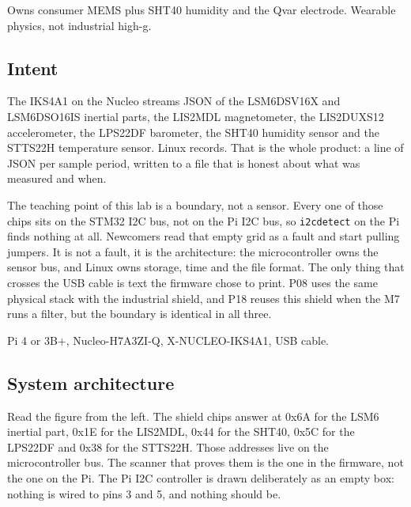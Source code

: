 
\begin{unique}
Owns consumer MEMS plus SHT40 humidity and the Qvar electrode. Wearable physics, not
industrial high-g.
\end{unique}

\subsection*{Intent}

The IKS4A1 on the Nucleo streams JSON of the LSM6DSV16X and LSM6DSO16IS inertial parts,
the LIS2MDL magnetometer, the LIS2DUXS12 accelerometer, the LPS22DF barometer, the SHT40
humidity sensor and the STTS22H temperature sensor. Linux records. That is the whole
product: a line of JSON per sample period, written to a file that is honest about what was
measured and when.

The teaching point of this lab is a boundary, not a sensor. Every one of those chips sits
on the STM32 I2C bus, not on the Pi I2C bus, so \texttt{i2cdetect} on the Pi finds nothing
at all. Newcomers read that empty grid as a fault and start pulling jumpers. It is not a
fault, it is the architecture: the microcontroller owns the sensor bus, and Linux owns
storage, time and the file format. The only thing that crosses the USB cable is text the
firmware chose to print. P08 uses the same physical stack with the industrial shield, and
P18 reuses this shield when the M7 runs a filter, but the boundary is identical in all
three.

\begin{kit}
Pi 4 or 3B+, Nucleo-H7A3ZI-Q, X-NUCLEO-IKS4A1, USB cable.
\end{kit}

\subsection*{System architecture}


Read the figure from the left. The shield chips answer at 0x6A for the LSM6 inertial part,
0x1E for the LIS2MDL, 0x44 for the SHT40, 0x5C for the LPS22DF and 0x38 for the STTS22H.
Those addresses live on the microcontroller bus. The scanner that proves them is the one
in the firmware, not the one on the Pi. The Pi I2C controller is drawn deliberately as an
empty box: nothing is wired to pins 3 and 5, and nothing should be.

